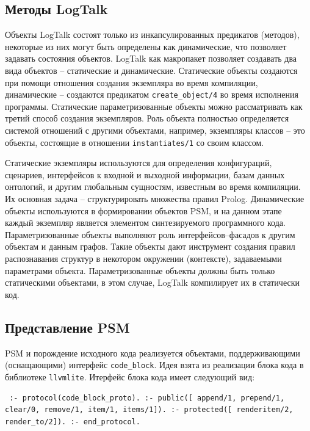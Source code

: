 \documentclass[conference]{IEEEtran} \IEEEoverridecommandlockouts
\begin{document}
\subsection{Методы LogTalk} \label{sec:lgt-methods} 

Объекты LogTalk состоят только из инкапсулированных предикатов (методов), некоторые из них могут быть определены как динамические, что позволяет задавать состояния объектов. LogTalk как макропакет позволяет создавать два вида объектов -- статические и динамические. Статические объекты создаются при помощи отношения создания экземпляра во время компиляции, динамические -- создаются предикатом \texttt{create\_object/4} во время исполнения программы. Статические параметризованные объекты можно рассматривать как третий способ создания экземпляров. Роль объекта полностью определяется системой отношений с другими объектами, например, экземпляры классов -- это объекты, состоящие в отношении \verb|instantiates/1| со своим классом. 

Статические экземпляры используются для определения конфигураций, сценариев, интерфейсов к входной и выходной информации, базам данных онтологий, и другим глобальным сущностям, известным во время компиляции. Их основная задача -- структурировать множества правил Prolog. Динамические объекты используются в формировании объектов PSM, и на данном этапе каждый экземпляр является элементом синтезируемого программного кода. Параметризованные объекты выполняют роль интерфейсов--фасадов к другим объектам и данным графов. Такие объекты дают инструмент создания правил распознавания структур в некотором окружении (контексте), задаваемыми параметрами объекта. Параметризованные объекты должны быть только статическими объектами, в этом случае, LogTalk компилирует их в статически код. 

\subsection{Представление PSM} \label{sec:blocks} 

PSM и порождение исходного кода реализуется объектами, поддерживающими (оснащающими) интерфейс \texttt{code\_block}. Идея взята из реализации блока кода в библиотеке \verb|llvmlite|. Итерфейс блока кода имеет следующий вид: \begin{verbatim} :- protocol(code_block_proto). :- public([ append/1, prepend/1, clear/0, remove/1, item/1, items/1]). :- protected([ renderitem/2, render_to/2]). :- end_protocol. \end{verbatim} 
\end{document}
